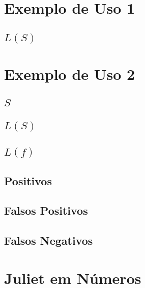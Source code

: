 \begin{apendicesenv}

\partapendices

\chapter{Exemplo de Uso 1} \label{apendice:eu1}
\section{$L(S)$} \label{apendice:eu1:LS}


\chapter{Exemplo de Uso 2} \label{apendice:eu2}
\section{$S$} \label{apendice:eu2:S}

\section{$L(S)$} \label{apendice:eu2:LS}

\section{$L(f)$} \label{apendice:eu2:Lf}

\section{Positivos} \label{apendice:eu2:positivo}

\section{Falsos Positivos} \label{apendice:eu2:falso_positivo}

\section{Falsos Negativos} \label{apendice:eu2:falso_negativo}

%

\chapter{Juliet em Números} \label{apendice:juliet_em_numeros_C}


\end{apendicesenv}
